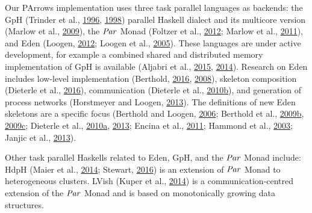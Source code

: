 \documentclass[paper=A4,twoside=true,openright,parskip=full,chapterprefix=true,headings=normal,bibliography=totoc,listof=totoc,titlepage=on,captions=tableabove,draft=false,british]{scrreprt}%
\begin{document}
Our PArrows implementation uses three task parallel languages as
backends: the GpH (Trinder et al.,
\protect\hyperlink{ref-Trinder1996}{1996},
\protect\hyperlink{ref-Trinder1998a}{1998}) parallel Haskell dialect and
its multicore version (Marlow et al.,
\protect\hyperlink{ref-Marlow2009}{2009}), the \ensuremath{\Conid{Par}} Monad (Foltzer et
al., \protect\hyperlink{ref-Foltzer:2012:MPC:2398856.2364562}{2012};
Marlow et al., \protect\hyperlink{ref-par-monad}{2011}), and Eden
(Loogen, \protect\hyperlink{ref-Loogen2012}{2012}; Loogen et al.,
\protect\hyperlink{ref-eden}{2005}). These languages are under active
development, for example a combined shared and distributed memory
implementation of GpH is available (Aljabri et al.,
\protect\hyperlink{ref-Aljabri2015}{2015},
\protect\hyperlink{ref-Aljabri:2013:DIG:2620678.2620682}{2014}).
Research on Eden includes low-level implementation (Berthold,
\protect\hyperlink{ref-berthold_loidl_hammond_2016}{2016},
\protect\hyperlink{ref-JostThesis}{2008}), skeleton composition
(Dieterle et al.,
\protect\hyperlink{ref-dieterle_horstmeyer_loogen_berthold_2016}{2016}),
communication (Dieterle et al.,
\protect\hyperlink{ref-Dieterle2010}{2010}\protect\hyperlink{ref-Dieterle2010}{b}),
and generation of process networks (Horstmeyer and Loogen,
\protect\hyperlink{ref-Horstmeyer2013}{2013}). The definitions of new
Eden skeletons are a specific focus (Berthold and Loogen,
\protect\hyperlink{ref-Eden:PARCO05}{2006}; Berthold et al.,
\protect\hyperlink{ref-Berthold2009-mr}{2009}\protect\hyperlink{ref-Berthold2009-mr}{b},
\protect\hyperlink{ref-Berthold2009-fft}{2009}\protect\hyperlink{ref-Berthold2009-fft}{c};
Dieterle et al.,
\protect\hyperlink{ref-dieterle2010skeleton}{2010}\protect\hyperlink{ref-dieterle2010skeleton}{a},
\protect\hyperlink{ref-Dieterle2013}{2013}; Encina et al.,
\protect\hyperlink{ref-delaEncina2011}{2011}; Hammond et al.,
\protect\hyperlink{ref-doi:10.1142ux2fS0129626403001380}{2003}; Janjic
et al., \protect\hyperlink{ref-janjic2013space}{2013}).

Other task parallel Haskells related to Eden, GpH, and the \ensuremath{\Conid{Par}} Monad
include: HdpH (Maier et al.,
\protect\hyperlink{ref-Maier:2014:HDS:2775050.2633363}{2014}; Stewart,
\protect\hyperlink{ref-stewart_maier_trinder_2016}{2016}) is an
extension of \ensuremath{\Conid{Par}} Monad to heterogeneous clusters. LVish (Kuper et al.,
\protect\hyperlink{ref-Kuper:2014:TPE:2666356.2594312}{2014}) is a
communication-centred extension of the \ensuremath{\Conid{Par}} Monad and is based on
monotonically growing data structures.
\end{document}

